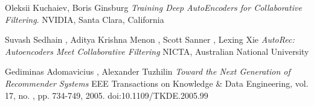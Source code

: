\documentclass[letterpaper,twocolumn,10pt]{article}
\begin{document}
\theendnotes


\begin{thebibliography}{9}
Oleksii Kuchaiev, Boris Ginsburg
\textit{Training Deep AutoEncoders for Collaborative Filtering}. 
NVIDIA, Santa Clara, California 
 
Suvash Sedhain , Aditya Krishna Menon , Scott Sanner , Lexing Xie
\textit{AutoRec: Autoencoders Meet Collaborative Filtering}
NICTA, Australian National University
 
Gediminas Adomavicius , Alexander Tuzhilin
\textit{Toward the Next Generation of Recommender Systems}
EEE Transactions on Knowledge & Data Engineering, vol. 17, no. , pp. 734-749, 2005. doi:10.1109/TKDE.2005.99
\end{thebibliography}
\end{document}
